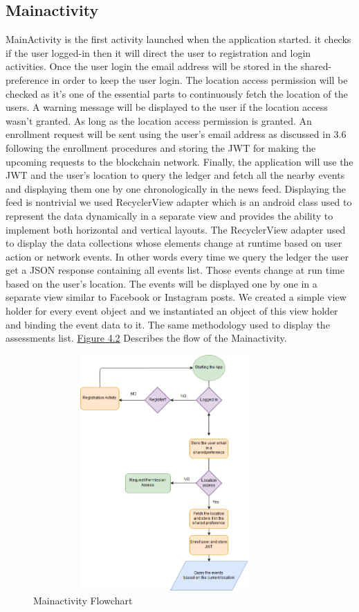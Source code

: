 \subsection{Mainactivity}
MainActivity is the first activity launched when the application started. it checks if the user logged-in then it will direct the user to registration and login activities. 
Once the user login the email address will be stored in the shared-preference in order to keep the user login. The location access permission will be checked as it's one of the essential parts to continuously fetch the location of the users. A warning message will be displayed to the user if the location access wasn't granted. As long as the location access permission is granted. An enrollment request will be sent using the user's email address as discussed in 3.6 following the enrollment procedures and storing the JWT for making the upcoming requests to the blockchain network.
Finally, the application will use the JWT and the user's location to query the ledger and fetch all the nearby events and displaying them one by one chronologically in the news feed. 
Displaying the feed is nontrivial we used RecyclerView adapter which is an android class used to represent the data dynamically in a separate view and provides the ability to implement both horizontal and vertical layouts. The RecyclerView adapter used to display the data collections whose elements change at runtime based on user action or network events.  In other words every time we query the ledger the user get a JSON response containing all events list. Those events change at run time based on the user's location. The events will be displayed one by one in a separate view similar to Facebook or Instagram posts. 
We created a simple view holder for every event object and we instantiated an object of this view holder and binding the event data to it.    
The same methodology used to display the assessments list.
\hyperref[fig:mainactivityflow]{Figure 4.2} Describes the flow of the Mainactivity. 
 \begin{figure}[H]
\center
\includegraphics[width=10cm,height=9cm]{images/mainactivityflow.png}
\caption{Mainactivity Flowchart}
\label{fig:mainactivityflow}
\end{figure}

